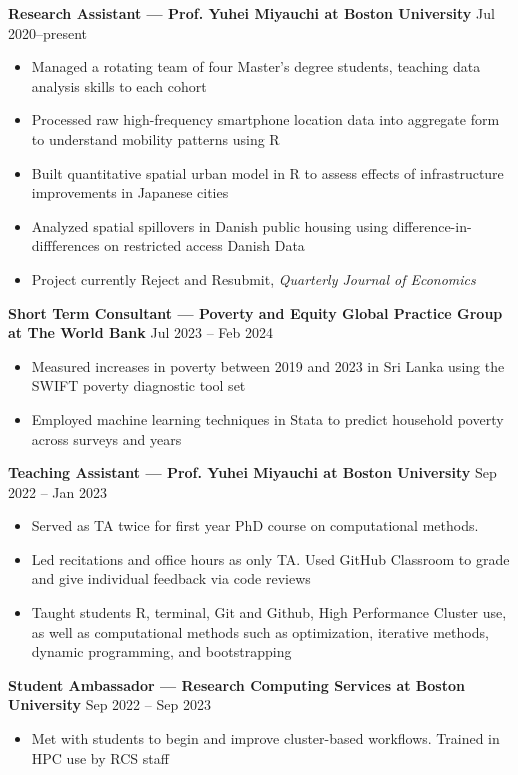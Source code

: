 \documentclass[10.5pt]{article}
\newenvironment{customitemize}
{ \begin{itemize}[leftmargin=\parindent, topsep = 0.2pt, itemsep = -3pt] }
{\end{itemize} }
\begin{document}
\noindent \textbf{Research Assistant --- Prof. Yuhei Miyauchi at Boston University}  \hfill Jul 2020--present 
\begin{customitemize}
	\item Managed a rotating team of four Master's degree students, teaching data analysis skills to each cohort
	\item Processed raw high-frequency smartphone location data into aggregate form to understand mobility patterns using R
	\item Built quantitative spatial urban model in R to assess effects of infrastructure improvements in Japanese cities
	\item Analyzed spatial spillovers in Danish public housing using difference-in-diffferences on restricted access Danish Data
	\item Project currently Reject and Resubmit, \textit{Quarterly Journal of Economics}
\end{customitemize}

\noindent \textbf{Short Term Consultant --- Poverty and Equity Global Practice Group at The World Bank}  \hfill Jul 2023 -- Feb 2024
\begin{customitemize}
	\item Measured increases in poverty between 2019 and 2023 in Sri Lanka using the SWIFT poverty diagnostic tool set
	\item Employed machine learning techniques in Stata to predict household poverty across surveys and years
\end{customitemize}

\noindent \textbf{Teaching Assistant --- Prof. Yuhei Miyauchi at Boston University}  \hfill Sep 2022 -- Jan 2023
\begin{customitemize}
	\item Served as TA twice for first year PhD course on computational methods. 
	\item Led recitations and office hours as only TA. Used GitHub Classroom to grade and give individual feedback via code reviews
	\item Taught students R, terminal, Git and Github, High Performance Cluster use, as well as computational methods such as optimization, iterative methods, dynamic programming, and bootstrapping 
\end{customitemize}

\noindent \textbf{Student Ambassador --- Research Computing Services at Boston University}  \hfill Sep 2022 -- Sep 2023
\begin{customitemize}
	\item Met with students to begin and improve cluster-based workflows. Trained in HPC use by RCS staff
\end{customitemize}
\end{document}
